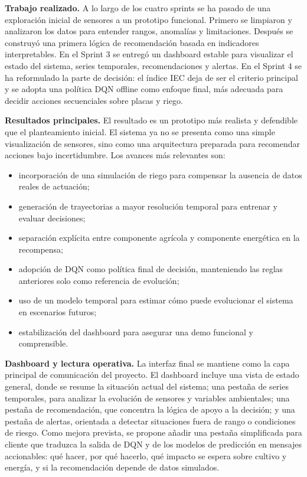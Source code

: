\documentclass[11pt,a4paper]{article}
\begin{document}
\textbf{Trabajo realizado.} A lo largo de los cuatro sprints se ha pasado de una exploración inicial de sensores a un prototipo funcional. Primero se limpiaron y analizaron los datos para entender rangos, anomalías y limitaciones. Después se construyó una primera lógica de recomendación basada en indicadores interpretables. En el Sprint 3 se entregó un dashboard estable para visualizar el estado del sistema, series temporales, recomendaciones y alertas. En el Sprint 4 se ha reformulado la parte de decisión: el índice IEC deja de ser el criterio principal y se adopta una política DQN offline como enfoque final, más adecuada para decidir acciones secuenciales sobre placas y riego.

\textbf{Resultados principales.} El resultado es un prototipo más realista y defendible que el planteamiento inicial. El sistema ya no se presenta como una simple visualización de sensores, sino como una arquitectura preparada para recomendar acciones bajo incertidumbre. Los avances más relevantes son:

\begin{itemize}
    \item incorporación de una simulación de riego para compensar la ausencia de datos reales de actuación;
    \item generación de trayectorias a mayor resolución temporal para entrenar y evaluar decisiones;
    \item separación explícita entre componente agrícola y componente energética en la recompensa;
    \item adopción de DQN como política final de decisión, manteniendo las reglas anteriores solo como referencia de evolución;
    \item uso de un modelo temporal para estimar cómo puede evolucionar el sistema en escenarios futuros;
    \item estabilización del dashboard para asegurar una demo funcional y comprensible.
\end{itemize}

\textbf{Dashboard y lectura operativa.} La interfaz final se mantiene como la capa principal de comunicación del proyecto. El dashboard incluye una vista de estado general, donde se resume la situación actual del sistema; una pestaña de series temporales, para analizar la evolución de sensores y variables ambientales; una pestaña de recomendación, que concentra la lógica de apoyo a la decisión; y una pestaña de alertas, orientada a detectar situaciones fuera de rango o condiciones de riesgo. Como mejora prevista, se propone añadir una pestaña simplificada para cliente que traduzca la salida de DQN y de los modelos de predicción en mensajes accionables: qué hacer, por qué hacerlo, qué impacto se espera sobre cultivo y energía, y si la recomendación depende de datos simulados.
\end{document}
